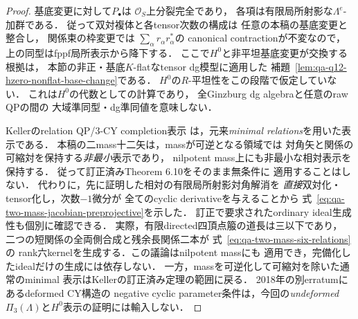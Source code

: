\begin{proof}
基底変更に対して$P_\bullet$は
$\mathcal O_S$上分裂完全であり，
各項は有限局所射影な$\Lambda^e$-加群である．
従って双対複体と各tensor次数の構成は
任意の本稿の基底変更と整合し，
関係束の枠変更では
$\sum_\alpha r_\alpha r_\alpha^*$の
canonical contractionが不変なので，
上の同型はfppf局所表示から降下する．
ここで$H^0$と非平坦基底変更が交換する根拠は，
本節の非正・基底$K$-flatなtensor dg模型に適用した
補題~\ref{lem:qa-q12-hzero-nonflat-base-change}である．
$H^0$の$R$-平坦性をこの段階で仮定していない．
これは$H^0$の代数としての計算であり，
全Ginzburg dg algebraと任意のraw QPの間の
大域準同型・dg準同値を意味しない．

Kellerのrelation QP/3-CY completion表示
\cite[Theorem 6.10 と訂正]{KellerDeformedCY2011}
は，元来\emph{minimal relations}を用いた表示である．
本稿の二mass十二矢は，massが可逆となる領域では
対角矢と関係の可縮対を保持する\emph{非最小}表示であり，
nilpotent mass上にも非最小な相対表示を保持する．
従って訂正済みTheorem 6.10をそのまま無条件に
適用することはしない．
代わりに，先に証明した相対の有限局所射影対角解消を
\emph{直接}双対化・tensor化し，次数$-1$微分が
全てのcyclic derivativeを与えることから
式~\eqref{eq:qa-two-mass-jacobian-preprojective}を示した．
訂正で要求されたordinary ideal生成性も個別に確認できる．
実際，有限directed四頂点箙の道長は三以下であり，
二つの短関係の全両側合成と残余長関係二本が
式~\eqref{eq:qa-two-mass-six-relations}の
rank六kernelを生成する．この議論はnilpotent massにも
適用でき，完備化したidealだけの生成には依存しない．
一方，massを可逆化して可縮対を除いた通常のminimal
表示はKellerの訂正済み定理の範囲に戻る．
2018年の別erratumにあるdeformed CY構造の
negative cyclic parameter条件は，今回の\emph{undeformed}
$\Pi_3(\Lambda)$と$H^0$表示の証明には輸入しない．
\end{proof}

